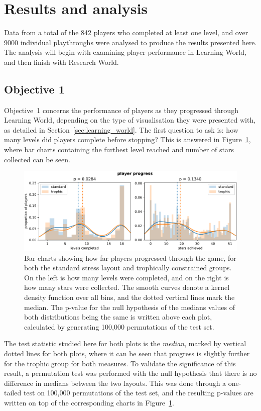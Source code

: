 \section{Results and analysis}
\label{sec:eco_results}

Data from a total of the 842 players who completed at least one level, and over 9000 individual playthroughs were analysed to produce the results presented here. The analysis will begin with examining player performance in Learning World, and then finish with Research World.

\subsection{Objective 1}
\label{sec:hypothesis1}
Objective~1 concerns the performance of players as they progressed through Learning World, depending on the type of visualisation they were presented with, as detailed in Section~\ref{sec:learning_world}.
The first question to ask is: how many levels did players complete before stopping? This is answered in Figure~\ref{fig:player_progression}, where bar charts containing the furthest level reached and number of stars collected can be seen.
\begin{figure}
    \centering
    \includegraphics[width=\textwidth]{joy/stars.pdf}
    \caption[Bar charts showing player progressed]{Bar charts showing how far players progressed through the game, for both the standard stress layout and trophically constrained groups. On the left is how many levels were completed, and on the right is how many stars were collected. The smooth curves denote a kernel density function over all bins, and the dotted vertical lines mark the median. The p-value for the null hypothesis of the medians values of both distributions being the same is written above each plot, calculated by generating 100,000 permutations of the test set.}
    \label{fig:player_progression}
\end{figure}
The test statistic studied here for both plots is the \emph{median}, marked by vertical dotted lines for both plots, where it can be seen that progress is slightly further for the trophic group for both measures.
To validate the significance of this result, a permutation test was performed with the null hypothesis that there is no difference in medians between the two layouts.
This was done through a one-tailed test on 100,000 permutations of the test set, and the resulting p-values are written on top of the corresponding charts in Figure~\ref{fig:player_progression}.

